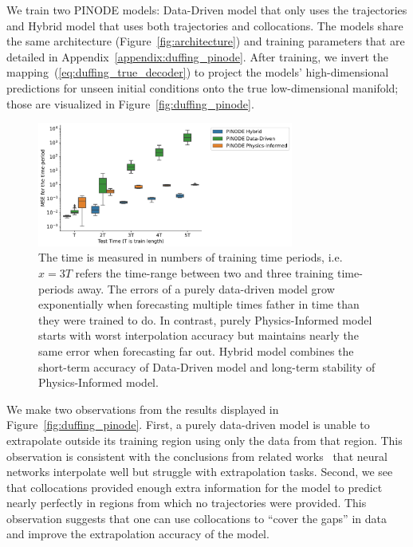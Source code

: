 We train two PINODE models: Data-Driven model that only uses the trajectories and Hybrid model that uses both trajectories and collocations. The models share the same architecture (Figure~\ref{fig:architecture}) and training parameters that are detailed in Appendix~\ref{appendix:duffing_pinode}. After training, we invert the mapping~(\ref{eq:duffing_true_decoder}) to project the models' high-dimensional predictions for unseen initial conditions onto the true low-dimensional manifold; those are visualized in  Figure~\ref{fig:duffing_pinode}.  

\begin{figure}[ht]
    \centering
    \includegraphics[width=0.75\textwidth]{figures/duffing_periods.pdf}
    \caption{ The time is measured in numbers of training time periods, i.e. $x=3T$ refers the time-range between two and three training time-periods away. The errors of a purely data-driven model grow exponentially when forecasting multiple times father in time than they were trained to do. In contrast, purely Physics-Informed model starts with worst interpolation accuracy but maintains nearly the same error when forecasting far out. Hybrid model combines the short-term accuracy of Data-Driven model and long-term stability of Physics-Informed model.}%
    \label{fig:duffing_periods}
\end{figure}




We make two observations from the results displayed in Figure~\ref{fig:duffing_pinode}. First, a purely data-driven model is unable to extrapolate outside its training region using only the data from that region. This observation is consistent with the conclusions from related works~\cite{gin2021deep} that neural networks interpolate well but struggle with extrapolation tasks. Second, we see that collocations provided enough extra information for the model to predict nearly perfectly in regions from which no trajectories were provided. This observation suggests that one can use collocations to ``cover the gaps'' in data and improve the extrapolation accuracy of the model. 

